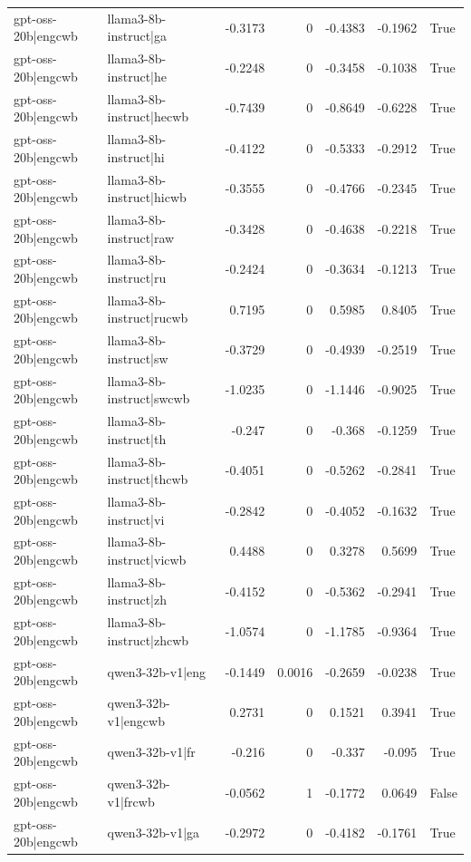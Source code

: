 \begin{table}
\begin{tabular}{l l r r r r l}
gpt-oss-20b|engcwb & llama3-8b-instruct|ga & -0.3173 & 0 & -0.4383 & -0.1962 & True \\
gpt-oss-20b|engcwb & llama3-8b-instruct|he & -0.2248 & 0 & -0.3458 & -0.1038 & True \\
gpt-oss-20b|engcwb & llama3-8b-instruct|hecwb & -0.7439 & 0 & -0.8649 & -0.6228 & True \\
gpt-oss-20b|engcwb & llama3-8b-instruct|hi & -0.4122 & 0 & -0.5333 & -0.2912 & True \\
gpt-oss-20b|engcwb & llama3-8b-instruct|hicwb & -0.3555 & 0 & -0.4766 & -0.2345 & True \\
gpt-oss-20b|engcwb & llama3-8b-instruct|raw & -0.3428 & 0 & -0.4638 & -0.2218 & True \\
gpt-oss-20b|engcwb & llama3-8b-instruct|ru & -0.2424 & 0 & -0.3634 & -0.1213 & True \\
gpt-oss-20b|engcwb & llama3-8b-instruct|rucwb & 0.7195 & 0 & 0.5985 & 0.8405 & True \\
gpt-oss-20b|engcwb & llama3-8b-instruct|sw & -0.3729 & 0 & -0.4939 & -0.2519 & True \\
gpt-oss-20b|engcwb & llama3-8b-instruct|swcwb & -1.0235 & 0 & -1.1446 & -0.9025 & True \\
gpt-oss-20b|engcwb & llama3-8b-instruct|th & -0.247 & 0 & -0.368 & -0.1259 & True \\
gpt-oss-20b|engcwb & llama3-8b-instruct|thcwb & -0.4051 & 0 & -0.5262 & -0.2841 & True \\
gpt-oss-20b|engcwb & llama3-8b-instruct|vi & -0.2842 & 0 & -0.4052 & -0.1632 & True \\
gpt-oss-20b|engcwb & llama3-8b-instruct|vicwb & 0.4488 & 0 & 0.3278 & 0.5699 & True \\
gpt-oss-20b|engcwb & llama3-8b-instruct|zh & -0.4152 & 0 & -0.5362 & -0.2941 & True \\
gpt-oss-20b|engcwb & llama3-8b-instruct|zhcwb & -1.0574 & 0 & -1.1785 & -0.9364 & True \\
gpt-oss-20b|engcwb & qwen3-32b-v1|eng & -0.1449 & 0.0016 & -0.2659 & -0.0238 & True \\
gpt-oss-20b|engcwb & qwen3-32b-v1|engcwb & 0.2731 & 0 & 0.1521 & 0.3941 & True \\
gpt-oss-20b|engcwb & qwen3-32b-v1|fr & -0.216 & 0 & -0.337 & -0.095 & True \\
gpt-oss-20b|engcwb & qwen3-32b-v1|frcwb & -0.0562 & 1 & -0.1772 & 0.0649 & False \\
gpt-oss-20b|engcwb & qwen3-32b-v1|ga & -0.2972 & 0 & -0.4182 & -0.1761 & True \\

\end{tabular}
\end{table}
